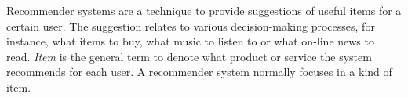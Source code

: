 


Recommender systems are a technique to provide suggestions of 
useful items for a certain user. The suggestion relates to various
decision-making processes, for instance, what items to buy, what music
to listen to or what on-line news to read. \textit{Item} is the general
term to denote what product or service the system recommends for each
user. A recommender system normally focuses in a kind of item\cite{resnick1997recommender}.

